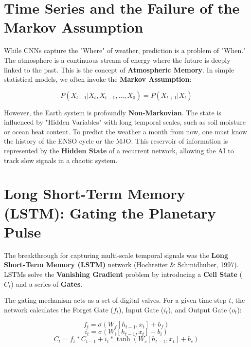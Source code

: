 \section{Time Series and the Failure of the Markov Assumption}

While CNNs capture the "Where" of weather, prediction is a problem of "When." The atmosphere is a continuous stream of energy where the future is deeply linked to the past. This is the concept of \textbf{Atmospheric Memory}. In simple statistical models, we often invoke the \textbf{Markov Assumption}:

\begin{equation}
P(X_{t+1} | X_t, X_{t-1}, \dots, X_0) = P(X_{t+1} | X_t)
\end{equation}

However, the Earth system is profoundly \textbf{Non-Markovian}. The state is influenced by "Hidden Variables" with long temporal scales, such as soil moisture or ocean heat content. To predict the weather a month from now, one must know the history of the ENSO cycle or the MJO. This reservoir of information is represented by the \textbf{Hidden State} of a recurrent network, allowing the AI to track slow signals in a chaotic system.

\section{Long Short-Term Memory (LSTM): Gating the Planetary Pulse}

The breakthrough for capturing multi-scale temporal signals was the \textbf{Long Short-Term Memory (LSTM)} network (Hochreiter \& Schmidhuber, 1997). LSTMs solve the \textbf{Vanishing Gradient} problem by introducing a \textbf{Cell State} ($C_t$) and a series of \textbf{Gates}.

The gating mechanism acts as a set of digital valves. For a given time step $t$, the network calculates the Forget Gate ($f_t$), Input Gate ($i_t$), and Output Gate ($o_t$):

\begin{equation}
f_t = \sigma(W_f [h_{t-1}, x_t] + b_f)
\end{equation}
\begin{equation}
i_t = \sigma(W_i [h_{t-1}, x_t] + b_i)
\end{equation}
\begin{equation}
C_t = f_t * C_{t-1} + i_t * \tanh(W_c [h_{t-1}, x_t] + b_c)
\end{equation}

